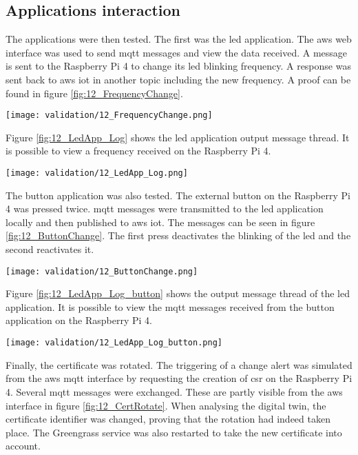 \subsection{Applications interaction}
The applications were then tested. The first was the led application. The \gls{aws} web interface was used to send \acrshort{mqtt} messages and view the data received. A message is sent to the Raspberry Pi 4 to change its led blinking frequency. A response was sent back to \gls{aws} \acrshort{iot} in another topic including the new frequency. A proof can be found in figure \ref{fig:12_FrequencyChange}.
\begin{center}
    \begingroup
    \texttt{[image: validation/12\_FrequencyChange.png]}
    \label{fig:12_FrequencyChange}
    \endgroup
\end{center}
Figure \ref{fig:12_LedApp_Log} shows the led application output message thread. It is possible to view a frequency received on the Raspberry Pi 4.
\begin{center}
    \begingroup
    \texttt{[image: validation/12\_LedApp\_Log.png]}
    \label{fig:12_LedApp_Log}
    \endgroup
\end{center}
The button application was also tested. The external button on the Raspberry Pi 4 was pressed twice. \acrshort{mqtt} messages were transmitted to the led application locally and then published to \gls{aws} \acrshort{iot}. The messages can be seen in figure \ref{fig:12_ButtonChange}. The first press deactivates the blinking of the led and the second reactivates it.
\begin{center}
    \begingroup
    \texttt{[image: validation/12\_ButtonChange.png]}
    \label{fig:12_ButtonChange}
    \endgroup
\end{center}
Figure \ref{fig:12_LedApp_Log_button} shows the output message thread of the led application. It is possible to view the \acrshort{mqtt} messages received from the button application on the Raspberry Pi 4.
\begin{center}
    \begingroup
    \texttt{[image: validation/12\_LedApp\_Log\_button.png]}
    \label{fig:12_LedApp_Log_button}
    \endgroup
\end{center}
Finally, the certificate was rotated. The triggering of a change alert was simulated from the \gls{aws} \acrshort{mqtt} interface by requesting the creation of \acrshort{csr} on the Raspberry Pi 4. Several \acrshort{mqtt} messages were exchanged. These are partly visible from the \gls{aws} interface in figure \ref{fig:12_CertRotate}. When analysing the digital twin, the certificate identifier was changed, proving that the rotation had indeed taken place. The Greengrass service was also restarted to take the new certificate into account.
